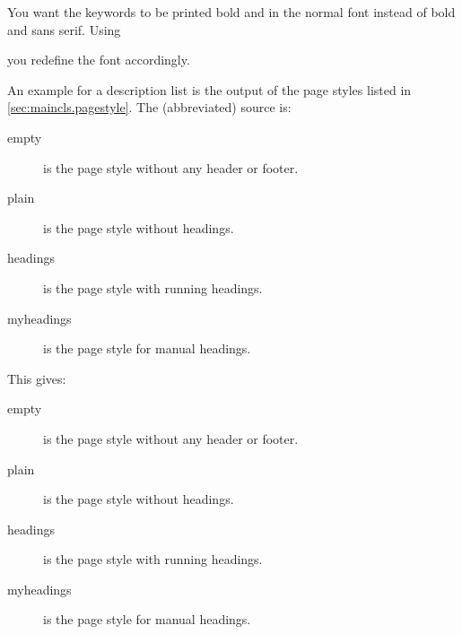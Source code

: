     \begin{Example}
      You want the keywords to be printed bold and in the normal font instead
      of bold and sans serif. Using
\begin{lstcode}
\end{lstcode}
      you redefine the font accordingly.

      An example for a description list is the output of the page styles
      listed in \autoref{sec:maincls.pagestyle}. The (abbreviated) source is:
\begin{lstcode}
  \begin{description}
    \item[empty] is the page style without any header or footer.
    \item[plain] is the page style without headings.
    \item[headings] is the page style with running headings.
    \item[myheadings] is the page style for manual headings.
  \end{description}
\end{lstcode}
      This gives:
      \begin{ShowOutput}
        \begin{description}
        \item[empty] is the page style without any header or footer.
        \item[plain] is the page style without headings.
        \item[headings] is the page style with running headings.
        \item[myheadings] is the page style for manual headings.
        \end{description}
      \end{ShowOutput}
    \end{Example}
  \fi%
  \EndIndexGroup%
\fi

